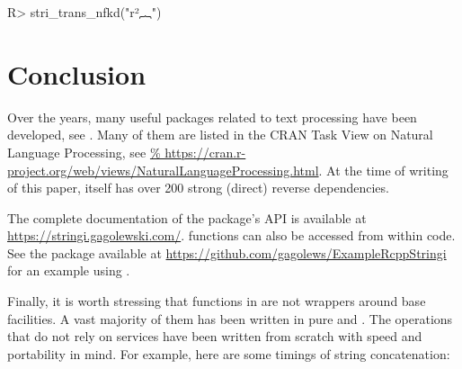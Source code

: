 \documentclass[nojss]{jss}
\begin{document}
\begin{Schunk}
\begin{Sinput}
R> stri_trans_nfkd("r²︷")
\end{Sinput}
\begin{Soutput}
[1] "r2{"
\end{Soutput}
\end{Schunk}





\section{Conclusion}\label{Sec:conclusions}

%


Over the years, many useful  packages related
to text processing have been developed, see \citep{textminingr,textr}.
Many of them are listed in the CRAN Task View
on Natural Language Processing, see \url{%
https://cran.r-project.org/web/views/NaturalLanguageProcessing.html}.
At the time of writing of this paper,
 itself has over 200 strong (direct) reverse dependencies.




The complete documentation of the package's API
is available at \url{https://stringi.gagolewski.com/}.
 functions can also be accessed
from within  code.
See the  package available at
\url{https://github.com/gagolews/ExampleRcppStringi}
for an example using  \citep{rcppbook}.





Finally, it is worth stressing that functions in 
are not wrappers around base  facilities.
A vast majority of them has been written in pure
 and . The operations that do not rely on 
services
have been written from scratch with speed and portability in mind.
For example, here are some timings of string concatenation:
\end{document}
